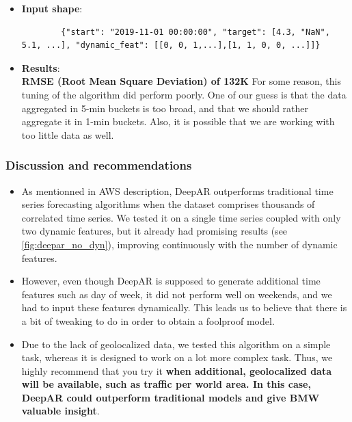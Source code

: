 \begin{enumerate}
\begin{itemize}
        \item[] \textbf{Input shape}:\\
        \begin{lstlisting}
        {"start": "2019-11-01 00:00:00", "target": [4.3, "NaN", 5.1, ...], "dynamic_feat": [[0, 0, 1,...],[1, 1, 0, 0, ...]]}
        \end{lstlisting}
        \item[] \textbf{Results}:\\
        \textbf{RMSE (Root Mean Square Deviation) of 132K}
        For some reason, this tuning of the algorithm did  perform poorly. One of our guess is that the data aggregated in 5-min buckets is too broad, and that we should rather aggregate it in 1-min buckets. Also, it is possible that we are working with too little data as well.
    \end{itemize}
\end{enumerate}


\subsubsection{Discussion and recommendations}

\begin{itemize}
    \item[] As mentionned in AWS description, DeepAR outperforms traditional time series forecasting algorithms when the dataset comprises thousands of correlated time series. We tested it on a single time series coupled with only two dynamic features, but it already had promising results (see \ref{fig:deepar_no_dyn}), improving continuously with the number of dynamic features.
    
    \item[] However, even though DeepAR is supposed to generate additional time features such as day of week, it did not perform well on weekends, and we had to input these features dynamically. This leads us to believe that there is a bit of tweaking to do in order to obtain a foolproof model.
    
    \item[] Due to the lack of geolocalized data, we tested this algorithm on a simple task, whereas it is designed to work on a lot more complex task. Thus, we highly recommend that you try it \textbf{when additional, geolocalized data will be available, such as traffic per world area. In this case, DeepAR could outperform traditional models and give BMW valuable insight}.
\end{itemize} 